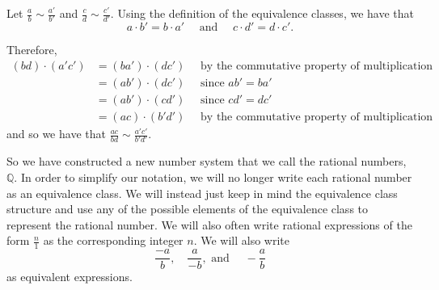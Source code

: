 \documentclass[
]{book}
\theoremstyle{definition}
\theoremstyle{definition}
\theoremstyle{definition}
\theoremstyle{definition}
\theoremstyle{remark}
\begin{document}
Let \(\frac{a}{b}\sim \frac{a'}{b'}\) and \(\frac{c}{d} \sim \frac{c'}{d'}\). Using the definition of the equivalence classes, we have that \[a\cdot b' = b \cdot a' \quad \mbox{ and } \quad c \cdot d' = d \cdot c'.\]

Therefore,
\begin{align*}
    (bd)\cdot (a'c') &= (ba') \cdot (dc') \quad \mbox{ by the commutative property of multiplication} \\
    &= (ab') \cdot (dc') \quad \mbox{ since } ab' = ba' \\
    &= (ab') \cdot (cd') \quad \mbox{ since } cd'=dc' \\
    &= (ac) \cdot (b'd') \quad \mbox{ by the commutative property of multiplication}
\end{align*}
and so we have that \(\frac{ac}{bd} \sim \frac{a'c'}{b'd'}\).

So we have constructed a new number system that we call the rational numbers, \(\mathbb{Q}\). In order to simplify our notation, we will no longer write each rational number as an equivalence class. We will instead just keep in mind the equivalence class structure and use any of the possible elements of the equivalence class to represent the rational number. We will also often write rational expressions of the form \(\frac{n}{1}\) as the corresponding integer \(n\). We will also write
\[\frac{-a}{b}, \quad \frac{a}{-b}, \mbox{ and }\quad -\frac{a}{b} \] as equivalent expressions.
\end{document}
